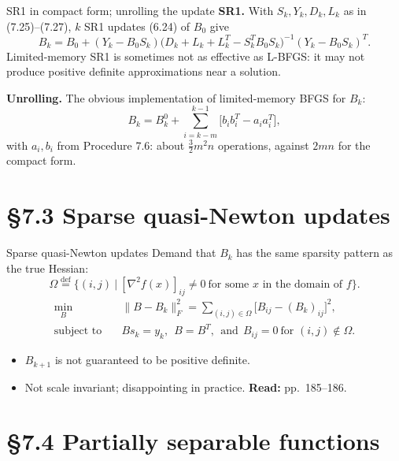 \documentclass[aspectratio=169,12pt]{beamer}
\newcommand{\hessf}{\nabla^{2} f}
\newcommand{\readbook}[1]{{\color{red}\textbf{Read:} #1}}
\begin{document}
\begin{frame}{SR1 in compact form; unrolling the update}
  \textbf{SR1.} With $S_{k},Y_{k},D_{k},L_{k}$ as in (7.25)--(7.27), $k$ SR1 updates (6.24) of $B_{0}$ give
  \[
    B_{k}=B_{0}+(Y_{k}-B_{0}S_{k})\big(D_{k}+L_{k}+L_{k}^{T}-S_{k}^{T}B_{0}S_{k}\big)^{-1}(Y_{k}-B_{0}S_{k})^{T} .
    \tag{7.30}
  \]
  Limited-memory SR1 is sometimes not as effective as L-BFGS: it may not produce
  positive definite approximations near a solution.

  \vspace{0.3em}
  \textbf{Unrolling.} The obvious implementation of limited-memory BFGS for $B_{k}$:
  \[ B_{k}=B_{k}^{0}+\sum_{i=k-m}^{k-1}\big[b_{i}b_{i}^{T}-a_{i}a_{i}^{T}\big] , \tag{7.33} \]
  with $a_{i},b_{i}$ from Procedure 7.6: about $\tfrac32m^{2}n$ operations, against $2mn$ for the compact form.
\end{frame}

\section{\S7.3 Sparse quasi-Newton updates}

\begin{frame}{Sparse quasi-Newton updates}
  Demand that $B_{k}$ has the same sparsity pattern as the true Hessian:
  \[ \Omega\overset{\text{def}}{=}\{(i,j)\ |\ [\hessf(x)]_{ij}\ne 0\ \text{for some $x$ in the domain of $f$}\} . \]
  \begin{align}
    \min_{B}\quad & \|B-B_{k}\|_{F}^{2}=\sum_{(i,j)\in\Omega}\big[B_{ij}-(B_{k})_{ij}\big]^{2}, \tag{7.34a}\\
    \text{subject to}\quad & Bs_{k}=y_{k},\ \ B=B^{T},\ \ \text{and}\ \ B_{ij}=0\ \text{for } (i,j)\notin\Omega . \tag{7.34b}
  \end{align}
  \begin{itemize}\setlength\itemsep{0.3em}
    \item $B_{k+1}$ is not guaranteed to be positive definite.
    \item Not scale invariant; \alert{disappointing in practice}. \readbook{pp.~185--186.}
  \end{itemize}
\end{frame}

\section{\S7.4 Partially separable functions}
\end{document}
